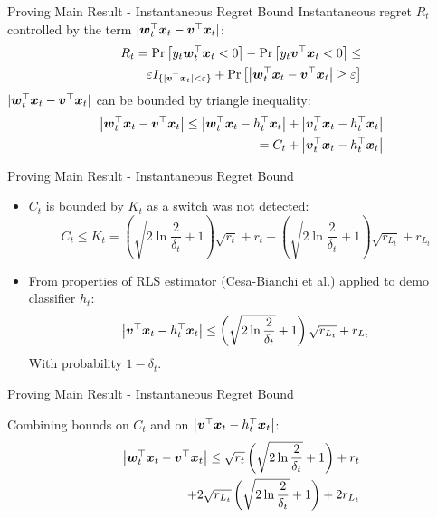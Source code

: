 \documentclass{beamer}
\begin{document}
\begin{frame}{Proving Main Result - Instantaneous Regret Bound}
Instantaneous regret $R_t$ controlled by the term $|{{\boldsymbol{w}}}^{\top}_{t}{\boldsymbol{x}}_{t}-{{\boldsymbol{v}}}^{\top}{\boldsymbol{x}}_{t}|$:
\begin{eqnarray*}
&&R_t={\rm Pr}\left[{y_t{{\boldsymbol{w}}}^{\top}_{t}{\boldsymbol{x}}_{t}<0}\right]-{\rm Pr}\left[{y_t{{\boldsymbol{v}}}^{\top}{\boldsymbol{x}}_{t}<0}\right]\leq\nonumber\\
&&\varepsilon I_{\{\left|{{\boldsymbol{v}}}^{\top}{\boldsymbol{x}}_{t}\right|<\varepsilon\}}+{\rm Pr}\left[{\left|{{\boldsymbol{w}}}^{\top}_{t}{\boldsymbol{x}}_{t}-{{\boldsymbol{v}}}^{\top}{\boldsymbol{x}}_{t}\right|\geq\varepsilon}\right]
\label{regret_wt_ht1}
\end{eqnarray*}
$|{{\boldsymbol{w}}}^{\top}_{t}{\boldsymbol{x}}_{t}-{{\boldsymbol{v}}}^{\top}{\boldsymbol{x}}_{t}|$ can be bounded by triangle inequality:
\begin{eqnarray*}
&&\left\vert{{\boldsymbol{w}}}^{\top}_{t}{\boldsymbol{x}}_{t}-{{\boldsymbol{v}}}^{\top}{\boldsymbol{x}}_{t}\right\vert\leq\left\vert{{\boldsymbol{w}}}^{\top}_{t}{\boldsymbol{x}}_{t}-h_{t}^{\top}{\boldsymbol{x}}_{t}\right\vert+\left\vert{{\boldsymbol{v}}}^{\top}_{t}{\boldsymbol{x}}_{t}-h_{t}^{\top}{\boldsymbol{x}}_{t}\right\vert\nonumber\\
&&=C_t+\left\vert{{\boldsymbol{v}}}^{\top}_{t}{\boldsymbol{x}}_{t}-h_{t}^{\top}{\boldsymbol{x}}_{t}\right\vert
\label{triangl_ht_wt}
\end{eqnarray*}
\end{frame}

\begin{frame}{Proving Main Result - Instantaneous Regret Bound}
\begin{itemize}
\item $C_t$ is bounded by $K_t$ as a switch was not detected:
\begin{equation*}
C_t\leq K_t=\left(\sqrt{2\ln{\frac{2}{\delta_t}}}+1\right)\sqrt{r_t}+r_t+\left(\sqrt{2\ln{\frac{2}{\delta_t}}}+1\right)\sqrt{r_{L_t}}+r_{L_t} 
\end{equation*}
\item From properties of RLS estimator (Cesa-Bianchi et al.) applied to demo classifier $h_t$:
\begin{equation*}
\left\vert{{\boldsymbol{v}}}^{\top}{\boldsymbol{x}}_{t}-h_{t}^{\top}{\boldsymbol{x}}_{t}\right\vert\leq\left(\sqrt{2\ln{\frac{2}{\delta_t}}}+1\right)\sqrt{r_{L_t}}+r_{L_t}
\label{rLt_false}
\end{equation*}
With probability $1-\delta_t$.
\end{itemize}
\end{frame}



\begin{frame}{Proving Main Result - Instantaneous Regret Bound}

Combining bounds on $C_t$ and on $\left\vert{{\boldsymbol{v}}}^{\top}{\boldsymbol{x}}_{t}-h_{t}^{\top}{\boldsymbol{x}}_{t}\right\vert$:
\begin{eqnarray*}
&&\left\vert{{\boldsymbol{w}}}^{\top}_{t}{\boldsymbol{x}}_{t}-{{\boldsymbol{v}}}^{\top}{\boldsymbol{x}}_{t}\right\vert\leq\sqrt{r_t}\left(\sqrt{2\ln{\frac{2}{\delta_t}}}+1\right)+r_t\nonumber\\
&&+2\sqrt{r_{L_t}}\left(\sqrt{2\ln{\frac{2}{\delta_t}}}+1\right)+2r_{L_t}
\label{triangl_ht_wt2}
\end{eqnarray*}

\end{frame}
\end{document}
